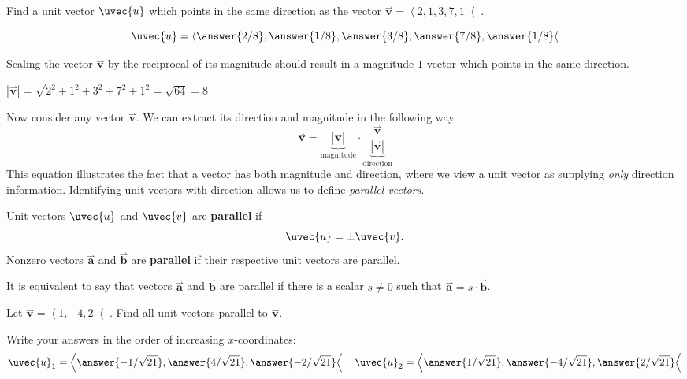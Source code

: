 \documentclass{ximera}
\begin{document}
\begin{question}
  Find a unit vector $\uvec{u}$ which points in the same direction as the vector $\overset{\rightharpoonup}{\mathbf{v}} = \left\langle 2,1,3,7,1 \right\langle$.
  \begin{prompt}
  \[
  \uvec{u} = \left\langle 
    \answer{2/8},
    \answer{1/8},
    \answer{3/8},
    \answer{7/8},
    \answer{1/8} \right\langle
  \]
  \end{prompt}
  \begin{hint}
    Scaling the vector $\overset{\rightharpoonup}{\mathbf{v}}$ by the reciprocal of its magnitude should result in a magnitude $1$ vector which points in the same direction.
  \end{hint}
  \begin{hint}
    $|\overset{\rightharpoonup}{\mathbf{v}}| = \sqrt{2^2+1^2+3^2+7^2+1^2} = \sqrt{64} = 8$
  \end{hint}
\end{question}

Now consider any vector $\overset{\rightharpoonup}{\mathbf{v}}$. We can  extract its direction
and magnitude in the following way.
\[
\overset{\rightharpoonup}{\mathbf{v}} = \underbrace{|\overset{\rightharpoonup}{\mathbf{v}}|}_{\text{magnitude}} \cdot \underbrace{\frac{\overset{\rightharpoonup}{\mathbf{v}}}{|\overset{\rightharpoonup}{\mathbf{v}}|}}_{\text{direction}}
\]
This equation illustrates the fact that a vector has both magnitude
and direction, where we view a unit vector as supplying \textit{only}
direction information. Identifying unit vectors with direction allows
us to define \textit{parallel vectors}.
\begin{definition}
Unit vectors $\uvec{u}$ and $\uvec{v}$ are \textbf{parallel} if
\[
\uvec{u} = \pm \uvec{v}.
\]
Nonzero vectors $\overset{\rightharpoonup}{\mathbf{a}}$ and $\overset{\rightharpoonup}{\mathbf{b}}$ are \textbf{parallel} if their
respective unit vectors are parallel.
\end{definition}
It is equivalent to say that vectors $\overset{\rightharpoonup}{\mathbf{a}}$ and $\overset{\rightharpoonup}{\mathbf{b}}$ are
parallel if there is a scalar $s\neq 0$ such that $\overset{\rightharpoonup}{\mathbf{a}} =
s\cdot\overset{\rightharpoonup}{\mathbf{b}}$.

\begin{question}
  Let $\overset{\rightharpoonup}{\mathbf{v}} = \left\langle 1,-4,2 \right\langle$. Find all unit vectors parallel to $\overset{\rightharpoonup}{\mathbf{v}}$.
  \begin{prompt}
    Write your answers in the order of increasing $x$-coordinates:
    \[
    \uvec{u}_1 = \left\langle \answer{-1/\sqrt{21}},\answer{4/\sqrt{21}},\answer{-2/\sqrt{21}} \right\langle \quad \uvec{u}_2 = \left\langle \answer{1/\sqrt{21}},\answer{-4/\sqrt{21}},\answer{2/\sqrt{21}} \right\langle
    \]
  \end{prompt}
\end{question}
\end{document}
